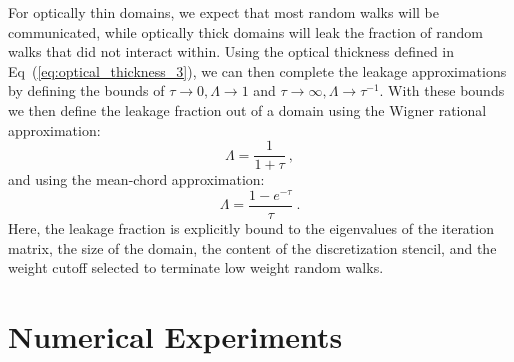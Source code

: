 \documentclass[preprint,11pt]{elsarticle}
\begin{document}
For optically thin domains, we expect that most random walks will be
communicated, while optically thick domains will leak the fraction of
random walks that did not interact within. Using the optical thickness defined in
Eq~(\ref{eq:optical_thickness_3}), we can then complete the leakage
approximations by defining the bounds of $\tau \rightarrow 0, \Lambda
\rightarrow 1$ and $\tau \rightarrow \infty, \Lambda \rightarrow \tau^{-1}$.
With these bounds we then define the leakage fraction out of a domain using
the Wigner rational approximation:
\begin{equation}
  \Lambda = \frac{1}{1+\tau}\:,
  \label{eq:wigner_domain_leakage}
\end{equation}
and using the mean-chord approximation:
\begin{equation}
  \Lambda = \frac{1-e^{-\tau}}{\tau}\:.
  \label{eq:mean_chord_domain_leakage}
\end{equation}
Here, the leakage fraction is explicitly bound to the eigenvalues of
the iteration matrix, the size of the domain, the content of the
discretization stencil, and the weight cutoff selected to terminate
low weight random walks.

\section{Numerical Experiments}
\label{sec:numerical_experiments}
\end{document}
